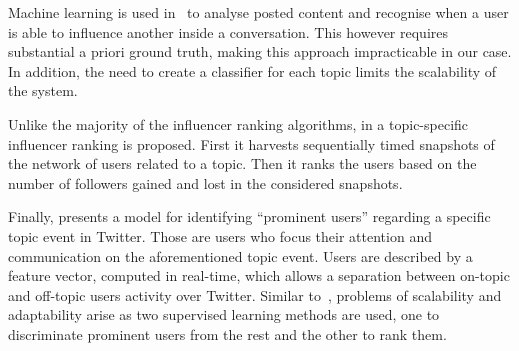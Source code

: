 Machine learning is used in~\cite{Biran2012} to analyse posted content and recognise when a user is able to influence another  inside a conversation.
This however requires substantial a priori ground truth, making this approach impracticable in our case. In addition, the need to create a classifier for each topic limits the scalability of the system.

	
Unlike the majority of the influencer ranking algorithms, in \cite{Schenk2011} a topic-specific influencer ranking is proposed. First it harvests sequentially timed snapshots of the network of users related to a topic. Then it ranks the users based on the number of followers gained and lost in the considered snapshots.

Finally, \cite{Bizid:2015:PUD:2808797.2809411} presents a model for identifying ``prominent users'' regarding a specific topic event in Twitter. Those are users who focus their attention and communication on the aforementioned topic event. Users are described by a feature vector, computed  in real-time, which allows a separation between on-topic and off-topic users activity over Twitter. Similar to~\cite{Biran2012}, problems of scalability and adaptability arise as two supervised learning methods are used, one to discriminate prominent users from the rest and the other to rank them.